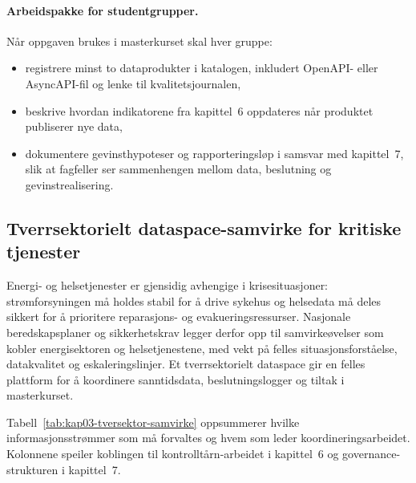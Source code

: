 \paragraph{Arbeidspakke for studentgrupper.} Når oppgaven brukes i masterkurset skal hver gruppe:
\begin{itemize}
    \item registrere minst to dataprodukter i katalogen, inkludert OpenAPI- eller AsyncAPI-fil og lenke til kvalitetsjournalen,
    \item beskrive hvordan indikatorene fra kapittel~6 oppdateres når produktet publiserer nye data,
    \item dokumentere gevinsthypoteser og rapporteringsløp i samsvar med kapittel~7, slik at fagfeller ser sammenhengen mellom
    data, beslutning og gevinstrealisering.
\end{itemize}


\subsection{Tverrsektorielt dataspace-samvirke for kritiske tjenester}
Energi- og helsetjenester er gjensidig avhengige i krisesituasjoner: strømforsyningen må holdes stabil for å drive sykehus og
helsedata må deles sikkert for å prioritere reparasjons- og evakueringsressurser. Nasjonale beredskapsplaner og sikkerhetskrav
legger derfor opp til samvirkeøvelser som kobler energisektoren og helsetjenestene, med vekt på felles situasjonsforståelse,
datakvalitet og eskaleringslinjer.\citep{dsb2023totalberedskap,nsm2023grunnprinsipper,nhn2024dataspace,statnett2024kontrolltarn,helsedir2023beredskap}
Et tverrsektorielt dataspace gir en felles plattform for å koordinere sanntidsdata, beslutningslogger og tiltak i masterkurset.

Tabell~\ref{tab:kap03-tversektor-samvirke} oppsummerer hvilke informasjonsstrømmer som må forvaltes og hvem som leder
koordineringsarbeidet. Kolonnene speiler koblingen til kontrolltårn-arbeidet i kapittel~6 og governance-strukturen i
kapittel~7.

